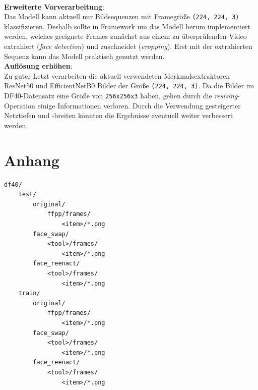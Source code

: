 \documentclass{article}
\newcommand{\imgsize}{\texttt{(224, 224, 3)}\xspace}
\newcommand{\resnet}{ResNet50\xspace}
\newcommand{\effnet}{EfficientNetB0\xspace}
\begin{document}
\\[0.5em]
\textbf{Erweiterte Vorverarbeitung}:\\
Das Modell kann aktuell nur Bildsequenzen mit Framegröße \imgsize klassifizieren.
Deshalb sollte in Framework um das Modell herum implementiert werden, welches geeignete Frames zunächst aus einem zu überprüfenden Video extrahiert (\textit{face detection}) und zuschneidet (\textit{cropping}).
Erst mit der extrahierten Sequenz kann das Modell praktisch genutzt werden.
\\[0.5em]
\textbf{Auflösung erhöhen}:\\
Zu guter Letzt verarbeiten die aktuell verwendeten Merkmalsextraktoren \resnet und \effnet Bilder der Größe \imgsize.
Da die Bilder im DF40-Datensatz eine Größe von \texttt{256x256x3} haben, gehen durch die \textit{resizing}-Operation einige Informationen verloren.
Durch die Verwendung gesteigerter Netztiefen und -breiten könnten die Ergebnisse eventuell weiter verbessert werden.

\newpage



\section*{Anhang}
\begin{lstlisting}[label={apx:lst.df40},caption={Ordnerstruktur des DF40-Datensets im \texttt{io/}-Verzeichnis}]
df40/
    test/
        original/
            ffpp/frames/
                <item>/*.png
        face_swap/
            <tool>/frames/
                <item>/*.png
        face_reenact/
            <tool>/frames/
                <item>/*.png
    train/
        original/
            ffpp/frames/
                <item>/*.png
        face_swap/
            <tool>/frames/
                <item>/*.png
        face_reenact/
            <tool>/frames/
                <item>/*.png
\end{lstlisting}
\end{document}
